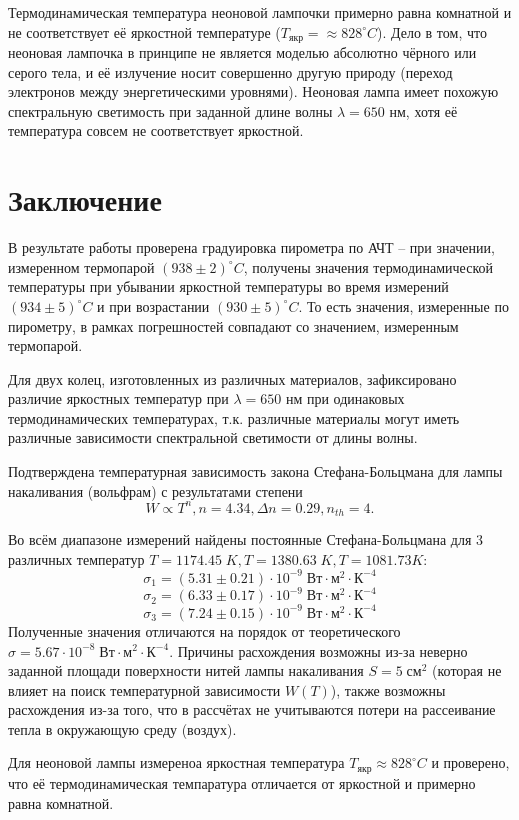     Термодинамическая температура неоновой лампочки примерно равна комнатной и не соответствует её яркостной температуре ($T_{\text{якр}} = \approx 828 ^\circ C$). Дело в том, что неоновая лампочка в принципе не является моделью абсолютно чёрного или серого тела, и её излучение носит совершенно другую природу (переход электронов между энергетическими уровнями). Неоновая лампа имеет похожую спектральную светимость при заданной длине волны $\lambda = 650$ нм, хотя её температура совсем не соответствует яркостной.


\section{Заключение}

    В результате работы проверена градуировка пирометра по АЧТ -- при значении, измеренном термопарой $(938 \pm 2) ^\circ C$, получены значения термодинамической температуры при убывании яркостной температуры во время измерений $(934 \pm 5) ^\circ C$ и при возрастании $(930 \pm 5) ^\circ C$. То есть значения, измеренные по пирометру, в рамках погрешностей совпадают со значением, измеренным термопарой.

    Для двух колец, изготовленных из различных материалов, зафиксировано различие яркостных температур при $\lambda = 650$ нм при одинаковых термодинамических температурах, т.к. различные материалы могут иметь различные зависимости спектральной светимости от длины волны.

    Подтверждена температурная зависимость закона Стефана-Больцмана для лампы накаливания (вольфрам) с результатами степени
    \begin{equation*}
        W \propto T^n, n = 4.34, \Delta n = 0.29, n_{th} = 4.
    \end{equation*}

    Во всём диапазоне измерений найдены постоянные Стефана-Больцмана для 3 различных температур $T = 1174.45 \; K, T = 1380.63 \; K, T = 1081.73 K$:
    $$ \sigma_1 = (5.31 \pm 0.21) \cdot 10^{-9} \; \text{Вт} \cdot \text{м}^2 \cdot \text{К}^{-4} $$
    $$ \sigma_2 = (6.33 \pm 0.17) \cdot 10^{-9} \; \text{Вт} \cdot \text{м}^2 \cdot \text{К}^{-4} $$
    $$ \sigma_3 = (7.24 \pm 0.15) \cdot 10^{-9} \; \text{Вт} \cdot \text{м}^2 \cdot \text{К}^{-4} $$
    Полученные значения отличаются на порядок от теоретического $\sigma = 5.67 \cdot 10^{-8} \; \text{Вт} \cdot \text{м}^2 \cdot \text{К}^{-4}$. Причины расхождения возможны из-за неверно заданной площади поверхности нитей лампы накаливания $S = 5 \; \text{см}^2$ (которая не влияет на поиск температурной зависимости $W(T)$), также возможны расхождения из-за того, что в рассчётах не учитываются потери на рассеивание тепла в окружающую среду (воздух).

    Для неоновой лампы измереноа яркостная температура $T_{\text{якр}} \approx 828 ^\circ C$ и проверено, что её термодинамическая темпаратура отличается от яркостной и примерно равна комнатной.



